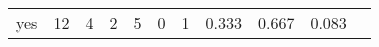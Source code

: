 \begin{longtable}{lp{1.10cm}p{1.10cm}p{1.10cm}p{1.10cm}p{1.10cm}p{1.10cm}p{1.10cm}p{1.10cm}p{1.10cm}p{1.10cm}}
yes       &                     12 &                                  4 &                                 2 &                                5 &                                 0 &                               1 &                          0.333 &                                 0.667 &                               0.083 \\
\end{longtable}
